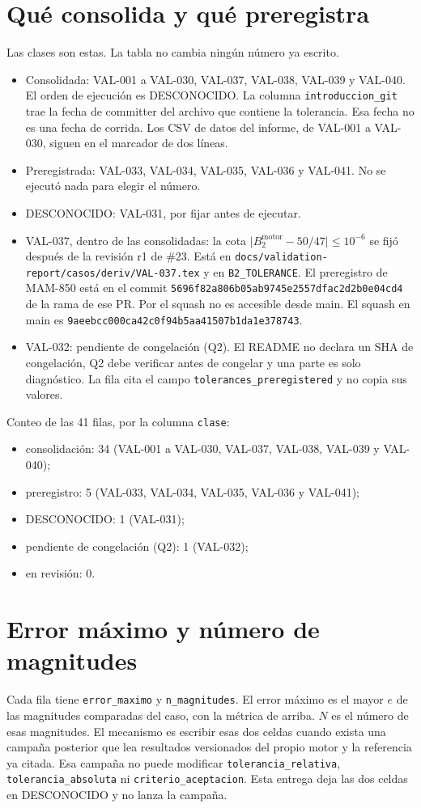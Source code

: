 \section{Qué consolida y qué preregistra}
Las clases son estas. La tabla no cambia ningún número ya escrito.
\begin{itemize}
\item Consolidada: VAL-001 a VAL-030, VAL-037, VAL-038, VAL-039 y VAL-040. El orden de ejecución es DESCONOCIDO. La columna \texttt{introduccion\_git} trae la fecha de committer del archivo que contiene la tolerancia. Esa fecha no es una fecha de corrida. Los CSV de datos del informe, de VAL-001 a VAL-030, siguen en el marcador de dos líneas.
\item Preregistrada: VAL-033, VAL-034, VAL-035, VAL-036 y VAL-041. No se ejecutó nada para elegir el número.
\item DESCONOCIDO: VAL-031, por fijar antes de ejecutar.
\item VAL-037, dentro de las consolidadas: la cota \(\lvert B_2^{\mathrm{motor}}-50/47\rvert\le 10^{-6}\) se fijó después de la revisión r1 de \#23. Está en \texttt{docs/validation-report/casos/deriv/VAL-037.tex} y en \texttt{B2\_TOLERANCE}. El preregistro de MAM-850 está en el commit \texttt{5696f82a806b05ab9745e2557dfac2d2b0e04cd4} de la rama de ese PR. Por el squash no es accesible desde main. El squash en main es \texttt{9aeebcc000ca42c0f94b5aa41507b1da1e378743}.
\item VAL-032: pendiente de congelación (Q2). El README no declara un SHA de congelación, Q2 debe verificar antes de congelar y una parte es solo diagnóstico. La fila cita el campo \texttt{tolerances\_preregistered} y no copia sus valores.
\end{itemize}

Conteo de las 41 filas, por la columna \texttt{clase}:
\begin{itemize}
\item consolidación: 34 (VAL-001 a VAL-030, VAL-037, VAL-038, VAL-039 y VAL-040);
\item preregistro: 5 (VAL-033, VAL-034, VAL-035, VAL-036 y VAL-041);
\item DESCONOCIDO: 1 (VAL-031);
\item pendiente de congelación (Q2): 1 (VAL-032);
\item en revisión: 0.
\end{itemize}

\section{Error máximo y número de magnitudes}
Cada fila tiene \texttt{error\_maximo} y \texttt{n\_magnitudes}. El error máximo es el mayor \(e\) de las magnitudes comparadas del caso, con la métrica de arriba. \(N\) es el número de esas magnitudes. El mecanismo es escribir esas dos celdas cuando exista una campaña posterior que lea resultados versionados del propio motor y la referencia ya citada. Esa campaña no puede modificar \texttt{tolerancia\_relativa}, \texttt{tolerancia\_absoluta} ni \texttt{criterio\_aceptacion}. Esta entrega deja las dos celdas en DESCONOCIDO y no lanza la campaña.

